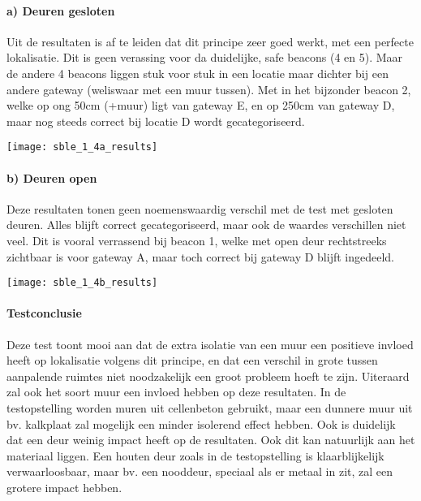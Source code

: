 \paragraph{a) Deuren gesloten}
\begin{minipage}{0.55\textwidth}
Uit de resultaten is af te leiden dat dit principe zeer goed werkt, met een perfecte lokalisatie. Dit is geen verassing voor da duidelijke, safe beacons (4 en 5). Maar de andere 4 beacons liggen stuk voor stuk in een locatie maar dichter bij een andere gateway (weliswaar met een muur tussen). Met in het bijzonder beacon 2, welke op ong 50cm (+muur) ligt van gateway E, en op 250cm van gateway D, maar nog steeds correct bij locatie D wordt gecategoriseerd.
\end{minipage}
\hfill
\begin{minipage}{0.42\textwidth}
	\texttt{[image: sble\_1\_4a\_results]}
	\label{fig:ond-ble-static-1-4a-res}
\end{minipage}

\paragraph{b) Deuren open}
\begin{minipage}{0.55\textwidth}
Deze resultaten tonen geen noemenswaardig verschil met de test met gesloten deuren. Alles blijft correct gecategoriseerd, maar ook de waardes verschillen niet veel. Dit is vooral verrassend bij beacon 1, welke met open deur rechtstreeks zichtbaar is voor gateway A, maar toch correct bij gateway D blijft ingedeeld.
\end{minipage}
\hfill
\begin{minipage}{0.42\textwidth}
	\texttt{[image: sble\_1\_4b\_results]}
	\label{fig:ond-ble-static-1-4b-res}
\end{minipage}

\paragraph{Testconclusie}
Deze test toont mooi aan dat de extra isolatie van een muur een positieve invloed heeft op lokalisatie volgens dit principe, en dat een verschil in grote tussen aanpalende ruimtes niet noodzakelijk een groot probleem hoeft te zijn. Uiteraard zal ook het soort muur een invloed hebben op deze resultaten. In de testopstelling worden muren uit cellenbeton gebruikt, maar een dunnere muur uit bv. kalkplaat zal mogelijk een minder isolerend effect hebben. Ook is duidelijk dat een deur weinig impact heeft op de resultaten. Ook dit kan natuurlijk aan het materiaal liggen. Een houten deur zoals in de testopstelling is klaarblijkelijk verwaarloosbaar, maar bv. een nooddeur, speciaal als er metaal in zit, zal een grotere impact hebben.

